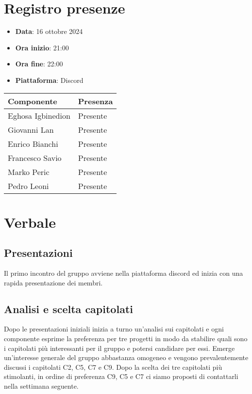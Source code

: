 \documentclass[a4paper, 12pt]{article}
\begin{document}
\section{Registro presenze}
   \begin{itemize}
        \item[] \textbf{Data}: 16 ottobre 2024
        \item[] \textbf{Ora inizio}:  21:00
        \item[] \textbf{Ora fine}: 22:00
        \item[] \textbf{Piattaforma}: Discord	
    \end{itemize}
\begin{table}[!h]
    \centering
    {\renewcommand{\arraystretch}{2}
    \begin{tabularx}{\textwidth}{| X | X |}
        \hline
            \textbf{\large Componente} & 
            \textbf{\large Presenza} \\ 
        \hline 
        \hline
            Eghosa Igbinedion&
            Presente \\
        \hline 
            Giovanni Lan&
            Presente \\
        \hline 
            Enrico Bianchi&
            Presente \\
        \hline 
            Francesco Savio&
            Presente \\
        \hline 
            Marko Peric&
            Presente \\
        \hline 
            Pedro Leoni&
            Presente \\
        \hline 

    \end{tabularx}}
\end{table}

\newpage

\section{Verbale}

\subsection{Presentazioni}
Il primo incontro del gruppo avviene nella piattaforma discord ed inizia con una rapida
presentazione dei membri.


\subsection{Analisi e scelta capitolati}
Dopo le presentazioni iniziali inizia a turno un'analisi sui capitolati e ogni 
componente esprime la preferenza per tre progetti in modo da stabilire quali sono i capitolati più interessanti per il gruppo e potersi candidare per essi.
Emerge un'interesse generale del gruppo abbastanza omogeneo e vengono prevalentemente discussi i capitolati C2, C5, C7 e C9. Dopo la scelta dei tre capitolati più stimolanti, in ordine 
di preferenza C9, C5 e C7 ci siamo proposti di contattarli nella settimana seguente.
\end{document}
